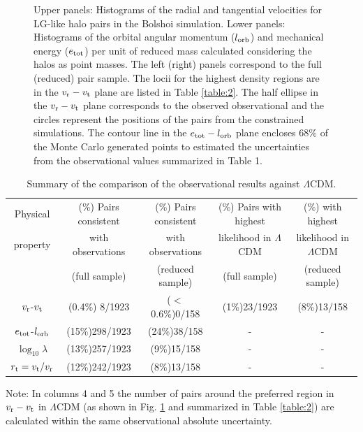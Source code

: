 \documentclass{emulateapj}
\begin{document}
\begin{figure}
\begin{center}
\caption{Upper panels: Histograms of the radial and tangential
  velocities for LG-like halo pairs in the Bolshoi simulation.   Lower
  panels: Histograms of the orbital angular momentum ($l_{\rm orb}$)
  and mechanical energy ($e_{\rm tot}$) per unit of reduced mass
  calculated considering the halos as point masses. The left (right) panels
  correspond to the full (reduced) pair sample. The locii for the highest
  density regions are in the $v_{\rm r}-v_{\rm t}$ plane are listed in
  Table \ref{table:2}. 
  The half ellipse in the $v_{\rm r}-v_{\rm t}$ plane corresponds to
  the observed observational and the circles represent the positions
  of the pairs from the constrained simulations. The contour line in
  the $e_{\rm tot}-l_{\rm orb}$ plane encloses $68\%$ of the Monte
  Carlo generated points to estimated the uncertainties from the
  observational values summarized in Table  1.}
\label{fig:rt}
\end{center}

\end{figure}


\begin{table}
\caption{Summary of the comparison of the observational results
  against $\Lambda$CDM.}
\begin{center}
\begin{tabular}{ccccc}\hline
Physical & (\%) Pairs consistent & (\%) Pairs consistent & (\%) Pairs
with highest & (\%) with highest\\ 
property & with observations & with observations & likelihood in
$\Lambda$CDM & likelihood in $\Lambda$CDM\\ 
 & (full sample) & (reduced sample) & (full sample) & (reduced sample)\\ \hline
$v_{\rm r}$-$v_{\rm t}$ & (0.4\%) 8/1923 & ($<$0.6\%)0/158 & (1\%)23/1923 & (8\%)13/158\\
$e_{\rm tot}$-$l_{\rm orb}$ & (15\%)298/1923 & (24\%)38/158 & - & -\\
$\log_{10}\lambda$ & (13\%)257/1923 & (9\%)15/158 & - & -\\
$r_{\rm t}=v_{\rm t}/v_{\rm r}$& (12\%)242/1923 & (8\%)13/158 & -& -\\\hline
\end{tabular}
\end{center}
\vspace{1mm}
Note: In columns 4 and 5 the number of pairs around the preferred region
in $v_{\rm r}-v_{\rm t}$ in $\Lambda$CDM (as shown in
Fig. \ref{fig:rt} and summarized in Table \ref{table:2}) are
calculated within the same observational absolute uncertainty.
\label{table:3}
\end{table}
\end{document}
